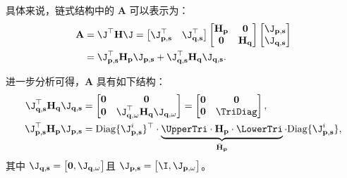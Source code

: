 具体来说，链式结构中的 $\mathbf{A}$ 可以表示为：
\begin{equation}
  \begin{aligned}
    \mathbf{A} & = \J^{\top} \mathbf{H} \J =
    \begin{bmatrix}
      \J_{\mathbf{p, s}}^{\top} &
      \J_{\mathbf{q, s}}^{\top}
    \end{bmatrix}
    \begin{bmatrix}
      \mathbf{H}_{\mathbf{p}} & \mathbf{0}              \\
      \mathbf{0}              & \mathbf{H}_{\mathbf{q}}
    \end{bmatrix}
    \begin{bmatrix}
      \J_{\mathbf{p, s}} \\
      \J_{\mathbf{q, s}}
    \end{bmatrix}                                                          \\
               & =\J^{\top}_{\mathbf{p, s}} \mathbf{H}_{\mathbf{p}} \J_{\mathbf{p, s}} +
    \J^{\top}_{\mathbf{q, s}} \mathbf{H}_{\mathbf{q}} \J_{\mathbf{q, s}}.
  \end{aligned}
  \label{eq:A}
\end{equation}

进一步分析可得，$\mathbf{A}$ 具有如下结构：
\begin{equation}
  \begin{aligned}
    \J_{\mathbf{q, s}}^{\top} \mathbf{H}_{\mathbf{q}} \J_{\mathbf{q, s}} & =
    \begin{bmatrix}
      \mathbf{0} & \mathbf{0}                                                                   \\
      \mathbf{0} & \J_{\mathbf{q, \omega}}^{\top}\mathbf{H}_{\mathbf{q}}\J_{\mathbf{q, \omega}}
    \end{bmatrix} =
    \begin{bmatrix}
      \mathbf{0} & \mathbf{0} \\
      \mathbf{0} & \TriDiag
    \end{bmatrix}
    ,                                                                        \\
    \J^{\top}_{\mathbf{p, s}} \mathbf{H}_{\mathbf{p}} \J_{\mathbf{p, s}} & =
    \mathrm{Diag}\{\J^{i}_{\mathbf{p,s}}\}^{\top} \cdot
    \underbrace{
    \UpperTri \cdot \mathbf{H}_{\mathbf{p}}\cdot \LowerTri}_{\bar{\mathbf{H}}_{\mathbf{p}}}
    \cdot \mathrm{Diag}\{\J^{i}_{\mathbf{p,s}}\},
  \end{aligned}
  \label{eq:JTHJ}
\end{equation}
其中 $\J_{\mathbf{q, s}} =
  \begin{bmatrix}
    \mathbf{0}, \J_{\mathbf{q,\omega}}
  \end{bmatrix}
$且 $\J_{\mathbf{p, s}} =
  \begin{bmatrix}
    \I, \J_{\mathbf{p, \omega}}
  \end{bmatrix}$。

